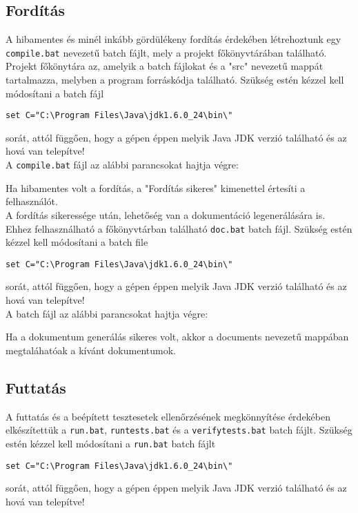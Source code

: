 \subsection{Fordítás}
A hibamentes és minél inkább gördülékeny fordítás érdekében létrehoztunk egy \texttt{compile.bat} nevezetű batch fájlt, mely a projekt főkönyvtárában található. Projekt főkönytára az, amelyik a batch fájlokat és a "src" nevezetű mappát tartalmazza, melyben a program forráskódja található. Szükség estén kézzel kell módosítani a batch fájl
\begin{verbatim}
set C="C:\Program Files\Java\jdk1.6.0_24\bin\" 
\end{verbatim}
sorát, attól függően, hogy a gépen éppen melyik Java JDK verzió található és az hová van telepítve!\\

A \texttt{compile.bat} fájl az alábbi parancsokat hajtja végre:

Ha hibamentes volt a fordítás, a "Fordítás sikeres" kimenettel értesíti a felhasználót.\\

A fordítás sikeressége után, lehetőség van a dokumentáció legenerálására is. Ehhez felhasználható a főkönyvtárban található \texttt{doc.bat} batch fájl.
Szükség estén kézzel kell módosítani a batch file \begin{verbatim}
set C="C:\Program Files\Java\jdk1.6.0_24\bin\" 
\end{verbatim}
sorát, attól függően, hogy a gépen éppen melyik Java JDK verzió található és az hová van telepítve!\\

A batch fájl az alábbi parancsokat hajtja végre:

Ha a dokumentum generálás sikeres volt, akkor a documents nevezetű mappában megtaláhatóak a kívánt dokumentumok.



\subsection{Futtatás}
A futtatás és a beépített tesztesetek ellenőrzésének megkönnyítése érdekében elkészítettük a \texttt{run.bat}, \texttt{runtests.bat} és a \texttt{verifytests.bat} batch fájlt.
Szükség estén kézzel kell módosítani a \texttt{run.bat} batch fájlt 
\begin{verbatim}
set C="C:\Program Files\Java\jdk1.6.0_24\bin\" 
\end{verbatim} sorát, attól függően, hogy a gépen éppen melyik Java JDK verzió található és az hová van telepítve!\\

